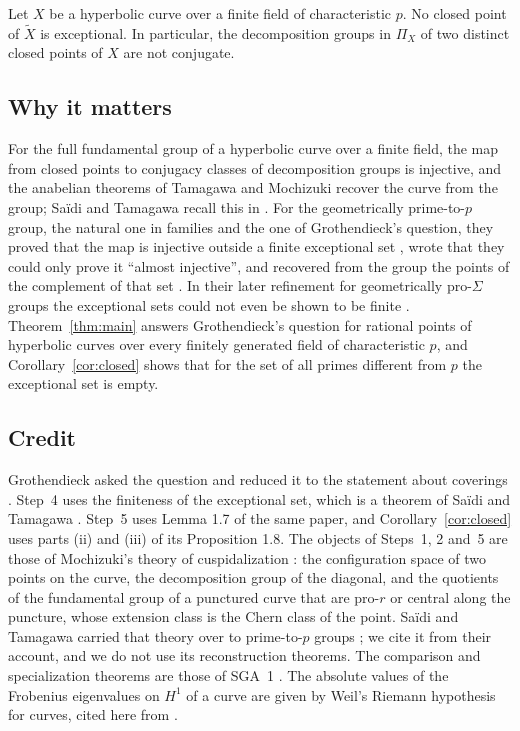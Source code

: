 \begin{maincor}\label{cor:closed}
Let $X$ be a hyperbolic curve over a finite field of characteristic $p$. No closed point of $\widetilde X$ is exceptional. In particular, the decomposition groups in $\Pi_X$ of two distinct closed points of $X$ are not conjugate.
\end{maincor}

\subsection{Why it matters}
For the full fundamental group of a hyperbolic curve over a finite field, the map from closed points to conjugacy classes of decomposition groups is injective, and the anabelian theorems of Tamagawa and Mochizuki recover the curve from the group; Sa\"idi and Tamagawa recall this in \cite[Introduction]{ST09}. For the geometrically prime-to-$p$ group, the natural one in families and the one of Grothendieck's question, they proved that the map is injective outside a finite exceptional set \cite[Proposition 1.8(vi), Corollary 1.11]{ST09}, wrote that they could only prove it ``almost injective'', and recovered from the group the points of the complement of that set \cite[Introduction]{ST09}. In their later refinement for geometrically pro-$\Sigma$ groups the exceptional sets could not even be shown to be finite \cite[Introduction, pp.~4--5]{ST18}. Theorem~\ref{thm:main} answers Grothendieck's question for rational points of hyperbolic curves over every finitely generated field of characteristic $p$, and Corollary~\ref{cor:closed} shows that for the set of all primes different from $p$ the exceptional set is empty.

\subsection{Credit}
Grothendieck asked the question and reduced it to the statement about coverings \cite[ms.~pp.~17--18]{Archive}. Step~4 uses the finiteness of the exceptional set, which is a theorem of Sa\"idi and Tamagawa \cite[Proposition 1.8(vi)]{ST09}. Step~5 uses Lemma 1.7 of the same paper, and Corollary~\ref{cor:closed} uses parts (ii) and (iii) of its Proposition 1.8. The objects of Steps~1, 2 and~5 are those of Mochizuki's theory of cuspidalization \cite{Moch}: the configuration space of two points on the curve, the decomposition group of the diagonal, and the quotients of the fundamental group of a punctured curve that are pro-$r$ or central along the puncture, whose extension class is the Chern class of the point. Sa\"idi and Tamagawa carried that theory over to prime-to-$p$ groups \cite[\S 2]{ST09}; we cite it from their account, and we do not use its reconstruction theorems. The comparison and specialization theorems are those of SGA~1 \cite{SGA1}. The absolute values of the Frobenius eigenvalues on $H^1$ of a curve are given by Weil's Riemann hypothesis for curves, cited here from \cite[Th\'eor\`eme 1.6]{WeilI}.


